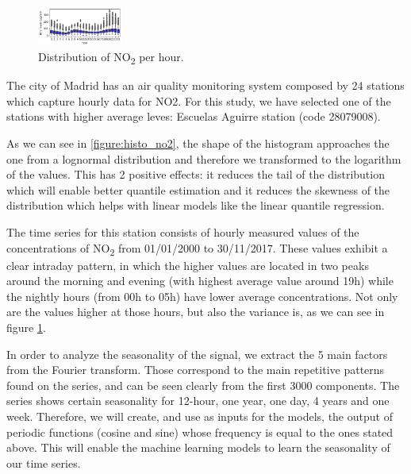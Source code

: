 \documentclass[a4paper,twocolumn,5p]{elsarticle}
\begin{document}
\begin{figure}
  \centering
  \includegraphics[width=0.25\textwidth]{NO2Var}
  \caption{\label{figure:variance}Distribution of NO\textsubscript{2}
    per hour.}
\end{figure}

The city of Madrid has an air quality monitoring system composed by 24
stations which capture hourly data for NO2.  %
For this study, we have selected one of
the stations with higher average leves: Escuelas Aguirre station (code
28079008).

As we can see in \ref{figure:histo_no2}, the shape of the histogram
approaches the one from a lognormal distribution and therefore we
transformed to the logarithm of the values. This has 2 positive
effects: it reduces the tail of the distribution which will enable
better quantile estimation and it reduces the skewness of the
distribution which helps with linear models like the linear quantile
regression.

The time series for this station consists of hourly measured values of
the concentrations of NO\textsubscript{2} from 01/01/2000 to
30/11/2017. These values exhibit a clear intraday pattern, in which
the higher values are located in two peaks around the morning and
evening (with highest average value around 19h) while the nightly
hours (from 00h to 05h) have lower average concentrations.  Not only
are the values higher at those hours, but also the variance is, as we
can see in figure \ref{figure:variance}.
 
In order to analyze the seasonality of the signal, we extract the 5
main factors from the Fourier transform. Those correspond to the main
repetitive patterns found on the series, and can be seen clearly from
the first 3000 components. The series shows certain seasonality for
12-hour, one year, one day, 4 years and one week.  Therefore, we will
create, and use as inputs for the models, the output of periodic
functions (cosine and sine) whose frequency is equal to the ones
stated above. This will enable the machine learning models to learn
the seasonality of our time series.
\end{document}
